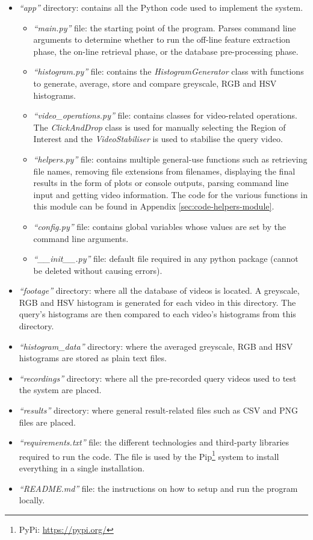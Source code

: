 \begin{itemize}
    \item \textit{``app''} directory: contains all the Python code used to implement the system.
    \begin{itemize}
        \item \textit{``main.py''} file: the starting point of the program. Parses command line arguments to determine whether to run the off-line feature extraction phase, the on-line retrieval phase, or the database pre-processing phase.
        \item \textit{``histogram.py''} file: contains the \textit{HistogramGenerator} class with functions to generate, average, store and compare greyscale, RGB and HSV histograms.
        \item \textit{``video\_operations.py''} file: contains classes for video-related operations. The \textit{ClickAndDrop} class is used for manually selecting the Region of Interest and the \textit{VideoStabiliser} is used to stabilise the query video.
        \item \textit{``helpers.py''} file: contains multiple general-use functions such as retrieving file names, removing file extensions from filenames, displaying the final results in the form of plots or console outputs, parsing command line input and getting video information. The code for the various functions in this module can be found in Appendix \ref{sec:code-helpers-module}.
        \item \textit{``config.py''} file: contains global variables whose values are set by the command line arguments.
        \item \textit{``\_\_init\_\_.py''} file: default file required in any python package (cannot be deleted without causing errors).
    \end{itemize}
    \item \textit{``footage''} directory: where all the database of videos is located. A greyscale, RGB and HSV histogram is generated for each video in this directory. The query's histograms are then compared to each video's histograms from this directory.
    \item \textit{``histogram\_data''} directory: where the averaged greyscale, RGB and HSV histograms are stored as plain text files.
    \item \textit{``recordings''} directory: where all the pre-recorded query videos used to test the system are placed.
    \item \textit{``results''} directory: where general result-related files such as CSV and PNG files are placed.
    \item \textit{``requirements.txt''} file: the different technologies and third-party libraries required to run the code. The file is used by the Pip\footnote{PyPi: \url{https://pypi.org/}} system to install everything in a single installation.
    \item \textit{``README.md''} file: the instructions on how to setup and run the program locally.
\end{itemize}

